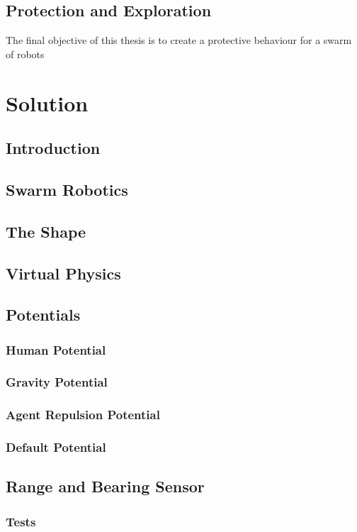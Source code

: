 \documentclass[a4paper, 12pt]{report}
\begin{document}
	\section{Protection and Exploration}
	
	The final objective of this thesis is to create a protective behaviour for a swarm of robots
	

\chapter{Solution}

	\section{Introduction}
	\section{Swarm Robotics}
	\section{The Shape}
	\section{Virtual Physics}
	\section{Potentials}
		\subsection{Human Potential}
		\subsection{Gravity Potential}
		\subsection{Agent Repulsion Potential}
		\subsection{Default Potential}
	\section{Range and Bearing Sensor}
		\subsection{Tests}
\end{document}
